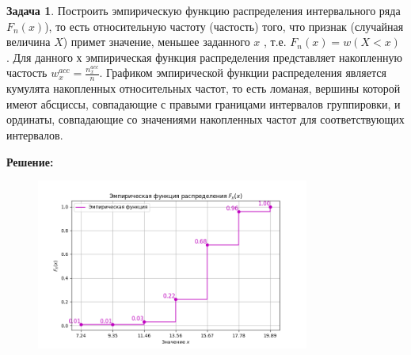 \documentclass[a4paper,12pt]{article}
\theoremstyle{definition}
\newtheorem{problem}{Задача}\setlength{\parindent}{0pt}
\newenvironment{solution}
{\begin{shaded}\textbf{Решение:}\par\setlength{\parindent}{0pt}}
{\end{shaded}}
\newenvironment{answer}
{\par\noindent\textbf{Ответ:} }
{\par}
\begin{document}
\vspace{8pt}
\begin{problem}
    Построить эмпирическую функцию распределения интервального ряда \(F_n(x)\)), то
    есть относительную частоту (частость) того, что признак (случайная величина \(X\)) 
    примет значение, меньшее заданного \(x\) , т.е. \(F_n(x) = w(X < x)\) . 
    Для данного \(х\) эмпирическая функция распределения представляет 
    накопленную частость \(w^{acc}_x = \frac{n^{acc}_x}{n}\).
    Графиком эмпирической функции распределения является кумулята накопленных
    относительных частот, то есть ломаная, вершины которой имеют абсциссы,
    совпадающие с правыми границами интервалов группировки, и ординаты,
    совпадающие со значениями накопленных частот для соответствующих
    интервалов.
    
        \begin{solution}
            \begin{figure}[H]
                \centering
                \includegraphics[width=0.8\textwidth]{plots/1.1.5.png}  
            \end{figure}
        \end{solution}
    
    
    \end{problem}
\end{document}
